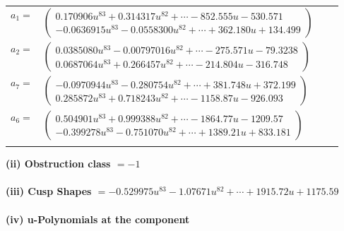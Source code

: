 \documentclass[1p]{elsarticle_modified}
\theoremstyle{definition}
\begin{document}
\begin{tabular}{m{7pt} m{180pt} m{7pt} m{180pt} }
\flushright $a_{1}=$&$\begin{pmatrix}0.170906 u^{83}+0.314317 u^{82}+\cdots-852.555 u-530.571\\-0.0636915 u^{83}-0.0558300 u^{82}+\cdots+362.180 u+134.499\end{pmatrix}$ \\
\flushright $a_{2}=$&$\begin{pmatrix}0.0385080 u^{83}-0.00797016 u^{82}+\cdots-275.571 u-79.3238\\0.0687064 u^{83}+0.266457 u^{82}+\cdots-214.804 u-316.748\end{pmatrix}$ \\
\flushright $a_{7}=$&$\begin{pmatrix}-0.0970944 u^{83}-0.280754 u^{82}+\cdots+381.748 u+372.199\\0.285872 u^{83}+0.718243 u^{82}+\cdots-1158.87 u-926.093\end{pmatrix}$ \\
\flushright $a_{6}=$&$\begin{pmatrix}0.504901 u^{83}+0.999388 u^{82}+\cdots-1864.77 u-1209.57\\-0.399278 u^{83}-0.751070 u^{82}+\cdots+1389.21 u+833.181\end{pmatrix}$\\&\end{tabular}
\flushleft \textbf{(ii) Obstruction class $= -1$}\\~\\
\flushleft \textbf{(iii) Cusp Shapes $= -0.529975 u^{83}-1.07671 u^{82}+\cdots+1915.72 u+1175.59$}\\~\\
\newpage\renewcommand{\arraystretch}{1}
\flushleft \textbf{(iv) u-Polynomials at the component}\newline \\
\end{document}
